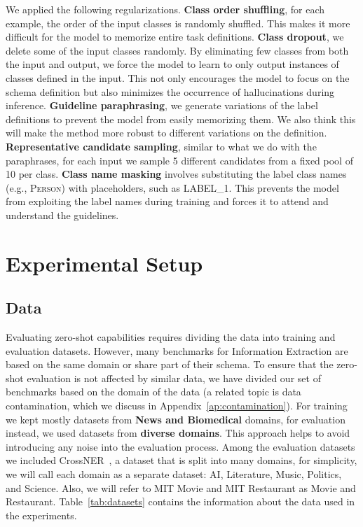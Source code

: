 We applied the following regularizations. \textbf{Class order shuffling}, for each example, the order of the input classes is randomly shuffled. This makes it more difficult for the model to memorize entire task definitions. \textbf{Class dropout}, we delete some of the input classes randomly. By eliminating few classes from both the input and output, we force the model to learn to only output instances of classes defined in the input. This not only encourages the model to focus on the schema definition but also minimizes the occurrence of hallucinations during inference. \textbf{Guideline paraphrasing}, we generate variations of the label definitions to prevent the model from easily memorizing them. We also think this will make the method more robust to different variations on the definition. \textbf{Representative candidate sampling}, similar to what we do with the paraphrases, for each input we sample 5 different candidates from a fixed pool of 10 per class. \textbf{Class name masking} involves substituting the label class names (e.g., \textsc{Person}) with placeholders, such as \textsc{LABEL\_1}. This prevents the model from exploiting the label names during training and forces it to attend and understand the guidelines. 

\section{Experimental Setup}

\subsection{Data}

Evaluating zero-shot capabilities requires dividing the data into training and evaluation datasets. However, many benchmarks for Information Extraction are based on the same domain or share part of their schema. To ensure that the zero-shot evaluation is not affected by similar data, we have divided our set of benchmarks based on the domain of the data (a related topic is data contamination, which we discuss in Appendix~\ref{ap:contamination}). For training we kept mostly datasets from \textbf{News and Biomedical} domains, for evaluation instead, we used datasets from \textbf{diverse domains}. This approach helps to avoid introducing any noise into the evaluation process. Among the evaluation datasets we included CrossNER~\citep{liu2021crossner}, a dataset that is split into many domains, for simplicity, we will call each domain as a separate dataset: AI, Literature, Music, Politics, and Science. Also, we will refer to MIT Movie and MIT Restaurant as Movie and Restaurant. Table~\ref{tab:datasets} contains the information about the data used in the experiments. 

